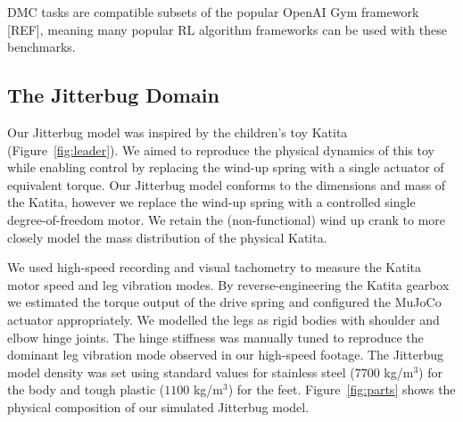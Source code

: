 \documentclass[letterpaper, 10 pt, conference]{ieeeconf}
\begin{document}
DMC tasks are compatible subsets of the popular OpenAI Gym framework [REF], meaning many popular RL algorithm frameworks can be used with these benchmarks.

\subsection{The Jitterbug Domain}

Our Jitterbug model was inspired by the children's toy Katita (Figure~\ref{fig:leader}).
We aimed to reproduce the physical dynamics of this toy while enabling control by replacing the wind-up spring with a single actuator of equivalent torque.
Our Jitterbug model conforms to the dimensions and mass of the Katita, however we replace the wind-up spring with a controlled single degree-of-freedom motor.
We retain the (non-functional) wind up crank to more closely model the mass distribution of the physical Katita.

We used high-speed recording and visual tachometry to measure the Katita motor speed and leg vibration modes.
By reverse-engineering the Katita gearbox we estimated the torque output of the drive spring and configured the MuJoCo actuator appropriately.
We modelled the legs as rigid bodies with shoulder and elbow hinge joints.
The hinge stiffness was manually tuned to reproduce the dominant leg vibration mode observed in our high-speed footage.
The Jitterbug model density was set using standard values for stainless steel ($7700$ kg/m$^3$) for the body and tough plastic ($1100$ kg/m$^3$) for the feet.
Figure~\ref{fig:parts} shows the physical composition of our simulated Jitterbug model.
\end{document}
